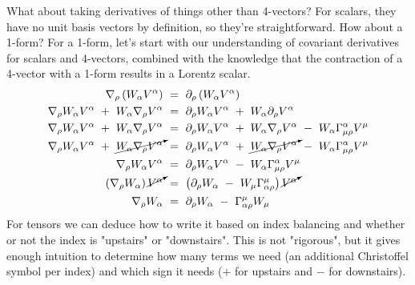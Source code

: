 \hskip 25pt What about taking derivatives of things other than 4-vectors?  For scalars, they have no unit basis vectors by
definition, so they're straightforward.  How about a 1-form?  For a 1-form, let's start with our understanding of
covariant derivatives for scalars and 4-vectors, combined with the knowledge that the contraction of a 4-vector with a
1-form results in a Lorentz scalar.
\begin{equation}
  \begin{aligned}
    \nabla_{\rho}\left (W_{\alpha}V^{\alpha}\right )\ &=\ \partial_{\rho}\left (W_{\alpha}V^{\alpha}\right ) \\
    \nabla_{\rho}W_{\alpha}V^{\alpha}\ +\ W_{\alpha}\nabla_{\rho}V^{\alpha}\ &=\
    \partial_{\rho}W_{\alpha}V^{\alpha}\ +\ W_{\alpha}\partial_{\rho}V^{\alpha} \\
    \nabla_{\rho}W_{\alpha}V^{\alpha}\ +\ W_{\alpha}\nabla_{\rho}V^{\alpha}\ &=\
    \partial_{\rho}W_{\alpha}V^{\alpha}\ +\ W_{\alpha}\nabla_{\rho}V^{\alpha}\ -\ W_{\alpha}\Gamma^{\alpha}_{\mu\rho}V^{\mu} \\
    \nabla_{\rho}W_{\alpha}V^{\alpha}\ +\ \cancelto{}{W_{\alpha}\nabla_{\rho}V^{\alpha}}\ &=\
    \partial_{\rho}W_{\alpha}V^{\alpha}\ +\ \cancelto{}{W_{\alpha}\nabla_{\rho}V^{\alpha}}\
    -\ W_{\alpha}\Gamma^{\alpha}_{\mu\rho}V^{\mu} \\
    \nabla_{\rho}W_{\alpha}V^{\alpha}\ &=\ \partial_{\rho}W_{\alpha}V^{\alpha}\ -\
    W_{\alpha}\Gamma^{\alpha}_{\mu\rho}V^{\mu} \\
    \left (\nabla_{\rho}W_{\alpha}\right )\cancelto{}{V^{\alpha}}\ &=\
    \left (\partial_{\rho}W_{\alpha}\ -\ W_{\mu}\Gamma^{\mu}_{\alpha\rho}\right )\cancelto{}{V^{\alpha}} \\
    \nabla_{\rho}W_{\alpha}\ &=\ \partial_{\rho}W_{\alpha}\ -\ \Gamma^{\mu}_{\alpha\rho}W_{\mu} 
  \end{aligned}
\end{equation}
For tensors we can deduce how to write it based on index balancing and whether or not the index is
"upstairs" or "downstairs".  This is not "rigorous", but it gives enough intuition to determine how many terms we need
(an additional Christoffel symbol per index) and which sign it needs ($+$ for upstairs and $-$ for downstairs).  
